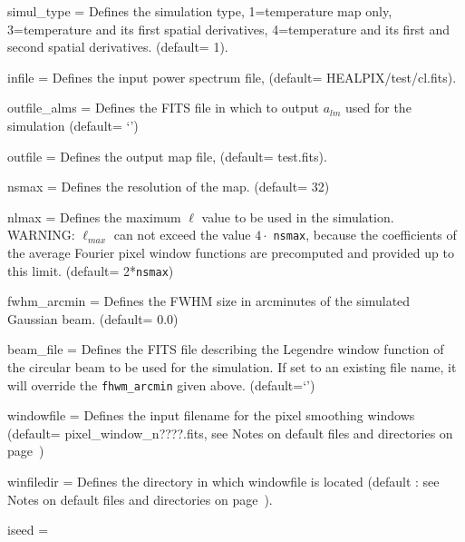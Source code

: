 \begin{qualifiers}
  \begin{qulistwide}{} %
     \item[{simul\_type = }]%
 Defines the simulation type, 1=temperature map only,
       3=temperature and its first spatial derivatives,
       4=temperature and its first and second spatial derivatives.
(default= 1).
    \item[{infile = }]%
 Defines the input power spectrum file,
	(default= HEALPIX/test/cl.fits).
%
    \item[{outfile\_alms = }]%
 Defines the FITS file in which to output $a_{lm}$ used
      for the simulation (default= `')
%
    \item[{outfile = }]%
 Defines the output map file, (default= test.fits).
%
    \item[{nsmax = }]%
 Defines the resolution of the map.
(default= 32)
%
     \item[{nlmax = }]%
 Defines the maximum $\ell$ value 
to be used in the simulation. WARNING: $\ell_{max}$ can not exceed
the value $4\cdot$ {\tt nsmax}, because the coefficients of the  average Fourier 
pixel window functions
are precomputed and provided up to this limit.
(default= 2*{\tt nsmax})
%
    \item[{fwhm\_arcmin = }]%
 Defines the FWHM size in arcminutes 
of the simulated Gaussian beam.
(default= 0.0)
%
    \item[{beam\_file = }]%
 Defines the FITS file describing the
    Legendre window
    function of the circular beam to be used for the
    simulation. If set to an existing file name, it will override the
    {\tt fhwm\_arcmin} given above. (default=`')
%
     \item[{windowfile = }]%
 Defines the input filename  for the pixel
    smoothing windows 
(default= pixel\_window\_n????.fits, see Notes on default files and directories
on page~\pageref{page:defdir})
%
     \item[{winfiledir = }] Defines the directory in which windowfile
    is located (default : see Notes on default files and directories on
page~\pageref{page:defdir}).
%
      \item[{iseed = }]%

\end{qulistwide}
\end{qualifiers}
